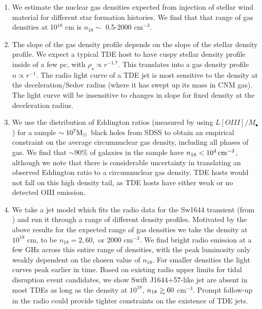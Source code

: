 \documentclass[usenatbib,fleqn]{mnras}
\newcommand\gsim{\mathrel{\rlap{\lower4pt\hbox{\hskip1pt$\sim$}}
    \raise1pt\hbox{$>$}}}
\newcommand{\Mbh}[1][]{M_{\bullet#1}}
\newcommand{\Msun}{{\rm M_\odot}}
\begin{document}
\begin{enumerate}
\item We estimate the nuclear gas densities expected from injection of
  stellar wind material for different star formation histories. We
  find that that range of gas densities at 10$^{18}$ cm is $n_{18}
  \sim$ 0.5-2000 cm$^{-3}$.

\item The slope of the gas density profile depends on the slope of the
  stellar density profile. We expect a typical TDE host to have cuspy
  stellar density profile inside of a few pc, with $\rho_\star
  \propto r^{-1.7}$. This translates into a gas density profile $n
  \propto r^{-1}$. The radio light curve of a TDE jet is most
  sensitive to the density at the deceleration/Sedov radius (where it
  has swept up its mass in CNM gas). The light curve will be
  insensitive to changes in slope for fixed density at the
  deceleration radius.

\item We use the distribution of Eddington ratios (measured by
  \citealt{Kauffmann&Heckman2009} using $L[OIII]/\Mbh$) for a sample
  $\sim 10^{7} \Msun$ black holes from SDSS to obtain an empirical
  constraint on the average circumnuclear gas density, including all
  phases of gas. We find that $\sim90\%$ of galaxies in the sample
  have $n_{18}<10^{4} \, {\rm cm}^{-3}$, although we note that there is
  considerable uncertainty in translating an observed Eddington ratio
  to a circumnuclear gas density. TDE hosts would not fall on this
  high density tail, as TDE hosts have either weak or no detected OIII
  emission.

\item We take a jet model which fits the radio data for the Sw1644
  transient (from \citealt{Mimica+2015}) and run it through a range of
  different density profiles. Motivated by the above results for the
  expected range of gas densities we take the density at $10^{18}$ cm,
  to be $n_{18}=2, 60,$ or 2000 cm$^{-3}$. We find bright radio
  emission at a few GHz across this entire range of densities, with
  the peak luminosity only weakly dependent on the chosen value of
  $n_{18}$.  For smaller densities the light curves peak earlier in
  time. Based on existing radio upper limits for tidal disruption
  event candidates, we show Swift J1644+57-like jet are absent in most TDEs
  as long as the density at $10^{18}$, $n_{18} \gsim  60$
  cm$^{-3}$. Prompt follow-up in the radio could provide tighter
  constraints on the existence of TDE jets.  
\end{enumerate}
\end{document}
